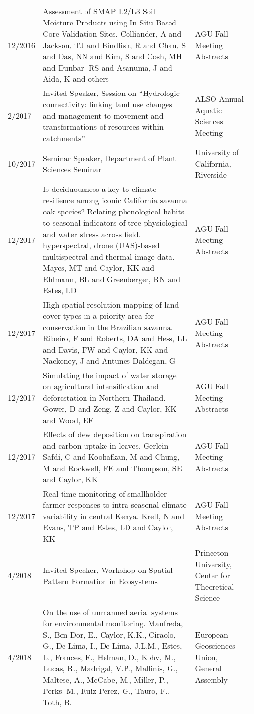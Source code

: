 \begin{supertabular}{lp{10.0cm}p{4.5cm}}
12/2016 & Assessment of SMAP L2/L3 Soil Moisture Products using In Situ Based Core Validation Sites. Colliander, A and Jackson, TJ and Bindlish, R and Chan, S and Das, NN and Kim, S and Cosh, MH and Dunbar, RS and Asanuma, J and Aida, K and others & AGU Fall Meeting Abstracts \\
2/2017 & Invited Speaker, Session on ``Hydrologic connectivity: linking land use changes and management to movement and transformations of resources within catchments'' &  ALSO Annual Aquatic Sciences Meeting \\
10/2017 & Seminar Speaker, Department of Plant Sciences Seminar & University of California, Riverside \\
12/2017 & Is deciduousness a key to climate resilience among iconic California savanna oak species? Relating phenological habits to seasonal indicators of tree physiological and water stress across field, hyperspectral, drone (UAS)-based multispectral and thermal image data. Mayes, MT and Caylor, KK and Ehlmann, BL and Greenberger, RN and Estes, LD & AGU Fall Meeting Abstracts \\
12/2017 & High spatial resolution mapping of land cover types in a priority area for conservation in the Brazilian savanna. Ribeiro, F and Roberts, DA and Hess, LL and Davis, FW and Caylor, KK and Nackoney, J and Antunes Daldegan, G & AGU Fall Meeting Abstracts \\
12/2017 & Simulating the impact of water storage on agricultural intensification and deforestation in Northern Thailand. Gower, D and Zeng, Z and Caylor, KK and Wood, EF & AGU Fall Meeting Abstracts \\
12/2017 & Effects of dew deposition on transpiration and carbon uptake in leaves. Gerlein-Safdi, C and Koohafkan, M and Chung, M and Rockwell, FE and Thompson, SE and Caylor, KK & AGU Fall Meeting Abstracts \\
12/2017 & Real-time monitoring of smallholder farmer responses to intra-seasonal climate variability in central Kenya. Krell, N and Evans, TP and Estes, LD and Caylor, KK & AGU Fall Meeting Abstracts \\
4/2018 & Invited Speaker, Workshop on Spatial Pattern Formation in Ecosystems & Princeton University, Center for Theoretical Science \\
4/2018 & On the use of unmanned aerial systems for environmental monitoring. Manfreda, S., Ben Dor, E., Caylor, K.K., Ciraolo, G., De Lima, I., De Lima, J.L.M., Estes, L., Frances, F., Helman, D., Kohv, M., Lucas, R., Madrigal, V.P., Mallinis, G., Maltese, A., McCabe, M., Miller, P., Perks, M., Ruiz-Perez, G., Tauro, F., Toth, B. & European Geosciences Union, General Assembly 

\end{supertabular}
